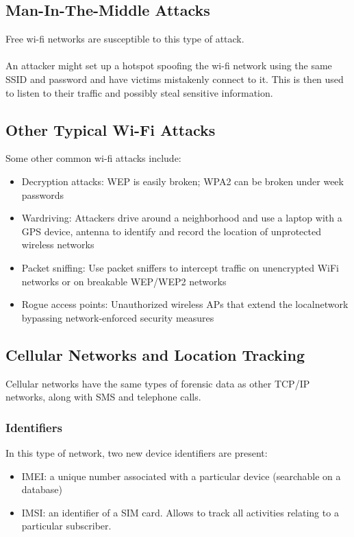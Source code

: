 \documentclass[10pt,a4paper]{report}
\begin{document}
\subsection{Man-In-The-Middle Attacks}
Free wi-fi networks are susceptible to this type of attack.\\
\\
An attacker might set up a hotspot spoofing the wi-fi network using the same SSID and password and have victims mistakenly connect to it. This is then used to listen to their traffic and possibly steal sensitive information.
\subsection{Other Typical Wi-Fi Attacks}
Some other common wi-fi attacks include:
\begin{itemize}
\item Decryption attacks: WEP is easily broken; WPA2 can be broken under week passwords
\item Wardriving: Attackers drive around a neighborhood and use a laptop with a GPS device, antenna to identify and record the location of unprotected wireless networks
\item Packet sniffing: Use packet sniffers to intercept traffic on unencrypted WiFi networks or on breakable WEP/WEP2 networks
\item Rogue access points: Unauthorized wireless APs that extend the localnetwork bypassing network-enforced security measures
\end{itemize}
\subsection{Cellular Networks and Location Tracking}
Cellular networks have the same types of forensic data as other TCP/IP networks, along with SMS and telephone calls.
\subsubsection{Identifiers}
In this type of network, two new device identifiers are present:
\begin{itemize}
\item IMEI: a unique number associated with a particular device (searchable on a database)
\item  IMSI: an identifier of a SIM card. Allows to track all activities relating to a particular subscriber.
\end{itemize}
\end{document}
